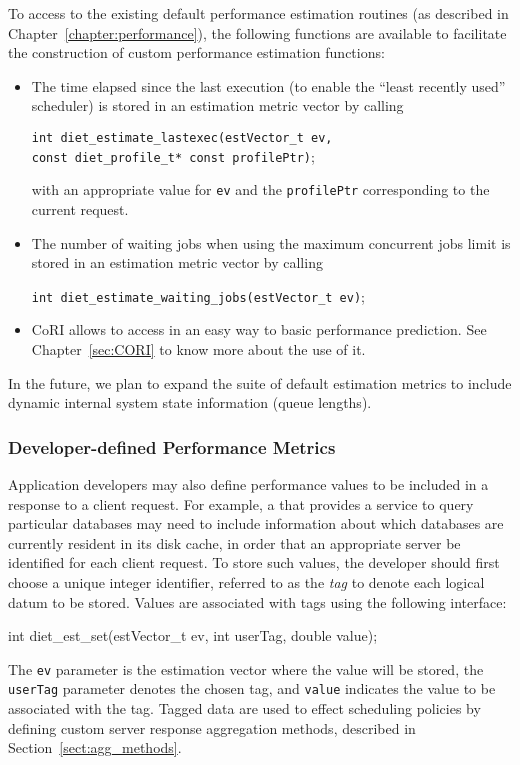 To access to the existing default performance estimation routines (as described
in Chapter~\ref{chapter:performance}), the following functions are available to
facilitate the construction of custom performance estimation functions:
\begin{itemize}
\item The time elapsed since the last execution (to enable the ``least recently used''
  scheduler) is stored in an estimation metric vector by calling
  \begin{tabbing}
    \texttt{int diet\_estimate\_lastexec(}\=\texttt{estVector\_t ev,} \\
    \> \texttt{const diet\_profile\_t* const profilePtr)};
  \end{tabbing}
  with an appropriate value for \texttt{ev} and the \texttt{profilePtr}
  corresponding to the current \diet request.
\item The number of waiting jobs when using the maximum concurrent jobs limit
  is stored in an estimation metric vector by calling
  \begin{tabbing}
    \texttt{int diet\_estimate\_waiting\_jobs(}\=\texttt{estVector\_t ev)};
  \end{tabbing}
\item CoRI allows to access in an easy way to basic performance
  prediction. See Chapter~\ref{sec:CORI} to know more about the use of it.
\end{itemize}

In the future, we plan to expand the suite of default estimation metrics to
include dynamic internal \diet system state information (\eg queue lengths).

\subsubsection{Developer-defined Performance Metrics}

Application developers may also define performance values to be included in a
\sed response to a client request.  For example, a \diet \sed that provides a
service to query particular databases may need to include information about
which databases are currently resident in its disk cache, in order that an
appropriate server be identified for each client request.  To store such
values, the \sed developer should first choose a unique integer identifier,
referred to as the \emph{tag} to denote each logical datum to be stored.
Values are associated with tags using the following interface:
\begin{code}
int diet\_est\_set(estVector\_t ev, int userTag, double value);
\end{code}
The \texttt{ev} parameter is the estimation vector where the value will be
stored, the \texttt{userTag} parameter denotes the chosen tag, and
\texttt{value} indicates the value to be associated with the tag.  Tagged data
are used to effect scheduling policies by defining custom server response
aggregation methods, described in Section~\ref{sect:agg_methods}.

